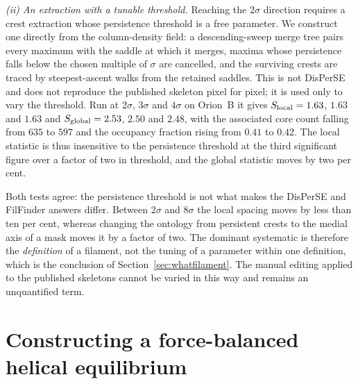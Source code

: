 \documentclass[usenatbib,twoside,twocolumn]{mnras}
\begin{document}
\smallskip\noindent\emph{(ii) An extraction with a tunable threshold.} Reaching the $2\sigma$ direction requires a crest extraction whose persistence threshold is a free parameter. We construct one directly from the column-density field: a descending-sweep merge tree pairs every maximum with the saddle at which it merges, maxima whose persistence falls below the chosen multiple of $\sigma$ are cancelled, and the surviving crests are traced by steepest-ascent walks from the retained saddles. This is not DisPerSE and does not reproduce the published skeleton pixel for pixel; it is used only to vary the threshold. Run at $2\sigma$, $3\sigma$ and $4\sigma$ on Orion~B it gives $S_{\rm local}=1.63$, $1.63$ and $1.63$ and $S_{\rm global}=2.53$, $2.50$ and $2.48$, with the associated core count falling from $635$ to $597$ and the occupancy fraction rising from $0.41$ to $0.42$. The local statistic is thus insensitive to the persistence threshold at the third significant figure over a factor of two in threshold, and the global statistic moves by two per cent.

\smallskip\noindent Both tests agree: the persistence threshold is not what makes the DisPerSE and FilFinder answers differ. Between $2\sigma$ and $8\sigma$ the local spacing moves by less than ten per cent, whereas changing the ontology from persistent crests to the medial axis of a mask moves it by a factor of two. The dominant systematic is therefore the \emph{definition} of a filament, not the tuning of a parameter within one definition, which is the conclusion of Section~\ref{sec:whatfilament}. The manual editing applied to the published skeletons cannot be varied in this way and remains an unquantified term.



\section{Constructing a force-balanced helical equilibrium}
\label{sec:helical}
\end{document}
